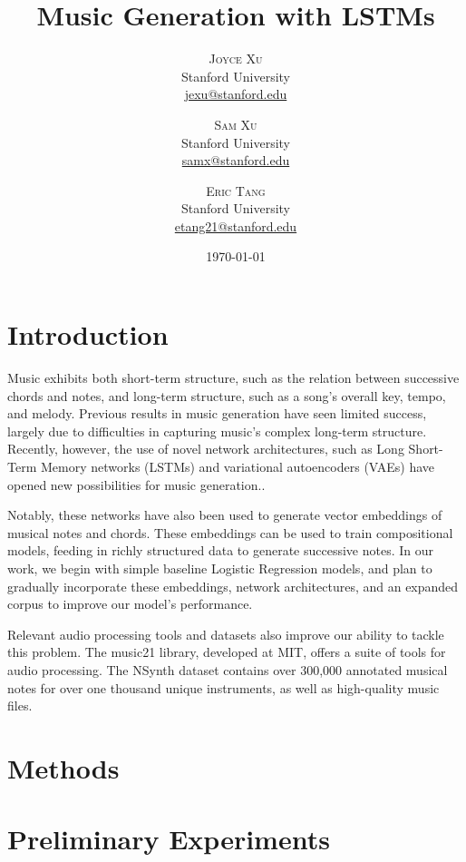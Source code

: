 \documentclass[twoside,twocolumn]{article}
\title{Music Generation with LSTMs} %
\author{%
\textsc{Joyce Xu} \\[1ex] %
\normalsize Stanford University \\ %
\normalsize \href{mailto:jexu@stanford.edu}{jexu@stanford.edu} %
\and %
\textsc{Sam Xu} \\[1ex] %
\normalsize Stanford University \\ %
\normalsize \href{mailto:samx}{samx@stanford.edu} %
\and %
\textsc{Eric Tang} \\[1ex] %
\normalsize Stanford University \\ %
\normalsize \href{mailto:etang21@stanford.edu}{etang21@stanford.edu} %
}
\date{\today} %
\begin{document}
\maketitle


\section{Introduction}

Music exhibits both short-term structure, such as the relation between successive chords and notes, and long-term structure, such as a song's overall key, tempo, and melody. Previous results in music generation have seen limited success, largely due to difficulties in capturing music's complex long-term structure. Recently, however, the use of novel network architectures, such as Long Short-Term Memory networks (LSTMs) and variational autoencoders (VAEs) have opened new possibilities for music generation.\cite{Magenta}.

Notably, these networks have also been used to generate vector embeddings of musical notes and chords. These embeddings can be used to train compositional models, feeding in richly structured data to generate successive notes. In our work, we begin with simple baseline Logistic Regression models, and plan to gradually incorporate these embeddings, network architectures, and an expanded corpus to improve our model's performance.

Relevant audio processing tools and datasets also improve our ability to tackle this problem. The music21 library, developed at MIT, offers a suite of tools for audio processing. The NSynth dataset contains over 300,000 annotated musical notes for over one thousand unique instruments, as well as high-quality music files.\cite{NSynth}



\section{Methods}



\section{Preliminary Experiments}
\end{document}
